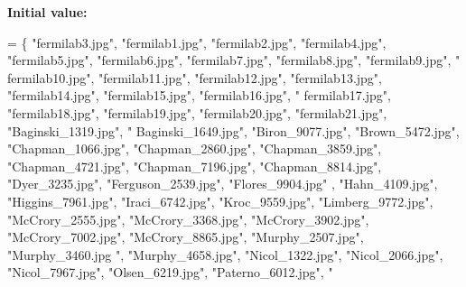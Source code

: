 {\bfseries Initial value\-:}
\begin{DoxyCode}
= \{ \textcolor{stringliteral}{"fermilab3.jpg"}, \textcolor{stringliteral}{"fermilab1.jpg"}, \textcolor{stringliteral}{"fermilab2.jpg"}, \textcolor{stringliteral}{"fermilab4.jpg"},
            \textcolor{stringliteral}{"fermilab5.jpg"}, \textcolor{stringliteral}{"fermilab6.jpg"}, \textcolor{stringliteral}{"fermilab7.jpg"}, \textcolor{stringliteral}{"fermilab8.jpg"}, \textcolor{stringliteral}{"fermilab9.jpg"}, \textcolor{stringliteral}{"
      fermilab10.jpg"}, \textcolor{stringliteral}{"fermilab11.jpg"},
            \textcolor{stringliteral}{"fermilab12.jpg"}, \textcolor{stringliteral}{"fermilab13.jpg"}, \textcolor{stringliteral}{"fermilab14.jpg"}, \textcolor{stringliteral}{"fermilab15.jpg"}, \textcolor{stringliteral}{"fermilab16.jpg"}, \textcolor{stringliteral}{"
      fermilab17.jpg"},
            \textcolor{stringliteral}{"fermilab18.jpg"}, \textcolor{stringliteral}{"fermilab19.jpg"}, \textcolor{stringliteral}{"fermilab20.jpg"}, \textcolor{stringliteral}{"fermilab21.jpg"}, \textcolor{stringliteral}{"Baginski\_1319.jpg"}, \textcolor{stringliteral}{"
      Baginski\_1649.jpg"},
            \textcolor{stringliteral}{"Biron\_9077.jpg"}, \textcolor{stringliteral}{"Brown\_5472.jpg"}, \textcolor{stringliteral}{"Chapman\_1066.jpg"}, \textcolor{stringliteral}{"Chapman\_2860.jpg"}, \textcolor{stringliteral}{"Chapman\_3859.jpg"},
       \textcolor{stringliteral}{"Chapman\_4721.jpg"},
            \textcolor{stringliteral}{"Chapman\_7196.jpg"}, \textcolor{stringliteral}{"Chapman\_8814.jpg"}, \textcolor{stringliteral}{"Dyer\_3235.jpg"}, \textcolor{stringliteral}{"Ferguson\_2539.jpg"}, \textcolor{stringliteral}{"Flores\_9904.jpg"}
      , \textcolor{stringliteral}{"Hahn\_4109.jpg"},
            \textcolor{stringliteral}{"Higgins\_7961.jpg"}, \textcolor{stringliteral}{"Iraci\_6742.jpg"}, \textcolor{stringliteral}{"Kroc\_9559.jpg"}, \textcolor{stringliteral}{"Limberg\_9772.jpg"}, \textcolor{stringliteral}{"McCrory\_2555.jpg"}, \textcolor{stringliteral}{
      "McCrory\_3368.jpg"},
            \textcolor{stringliteral}{"McCrory\_3902.jpg"}, \textcolor{stringliteral}{"McCrory\_7002.jpg"}, \textcolor{stringliteral}{"McCrory\_8865.jpg"}, \textcolor{stringliteral}{"Murphy\_2507.jpg"}, \textcolor{stringliteral}{"Murphy\_3460.jpg
      "}, \textcolor{stringliteral}{"Murphy\_4658.jpg"},
            \textcolor{stringliteral}{"Nicol\_1322.jpg"}, \textcolor{stringliteral}{"Nicol\_2066.jpg"}, \textcolor{stringliteral}{"Nicol\_7967.jpg"}, \textcolor{stringliteral}{"Olsen\_6219.jpg"}, \textcolor{stringliteral}{"Paterno\_6012.jpg"}, \textcolor{stringliteral}{"
}
\end{DoxyCode}
